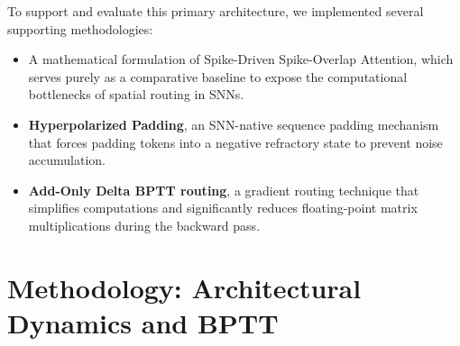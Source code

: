 \documentclass[final]{clv2025}
\begin{document}
To support and evaluate this primary architecture, we implemented several supporting methodologies:
\begin{itemize}
    \item A mathematical formulation of Spike-Driven Spike-Overlap Attention, which serves purely as a comparative baseline to expose the computational bottlenecks of spatial routing in SNNs.
    \item \textbf{Hyperpolarized Padding}, an SNN-native sequence padding mechanism that forces padding tokens into a negative refractory state to prevent noise accumulation.
    \item \textbf{Add-Only Delta BPTT routing}, a gradient routing technique that simplifies computations and significantly reduces floating-point matrix multiplications during the backward pass.
\end{itemize}

\section{Methodology: Architectural Dynamics and BPTT}
\end{document}
